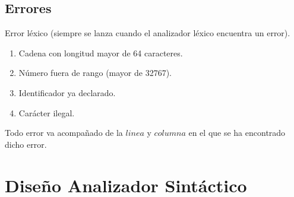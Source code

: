 \documentclass[11pt, , a4paper, titlepage]{article}
\begin{document}
\subsection{Errores}
Error léxico (siempre se lanza cuando el analizador léxico encuentra un error).
\begin{enumerate}
    \item Cadena con longitud mayor de 64 caracteres.
    \item Número fuera de rango (mayor de 32767).
    \item Identificador ya declarado.
    \item Carácter ilegal.
\end{enumerate}
Todo error va acompañado de la $linea$ y $columna$ en el que se ha encontrado dicho error.
\clearpage

\section{Diseño Analizador Sintáctico}
\end{document}

